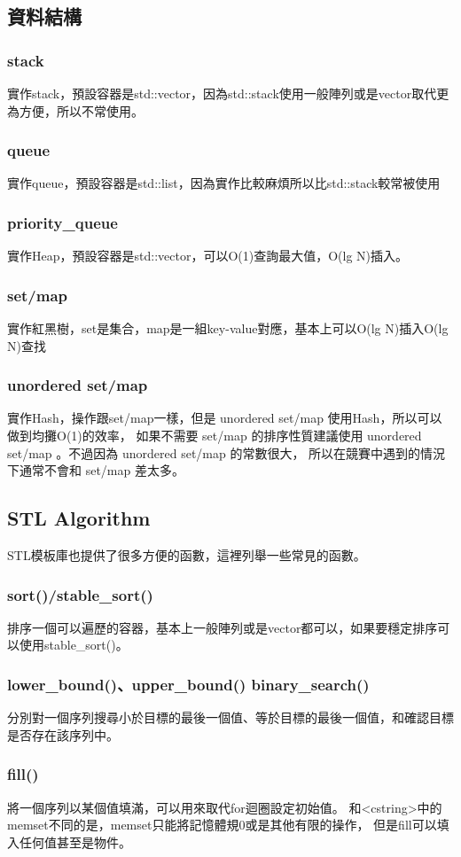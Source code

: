 \documentclass{article}
\begin{document}
\subsection{資料結構}
\subsubsection{stack}
實作stack，預設容器是std::vector，因為std::stack使用一般陣列或是vector取代更為方便，所以不常使用。
\subsubsection{queue}
實作queue，預設容器是std::list，因為實作比較麻煩所以比std::stack較常被使用
\subsubsection{priority\_queue}
實作Heap，預設容器是std::vector，可以O(1)查詢最大值，O(lg N)插入。
\subsubsection{set/map}
實作紅黑樹，set是集合，map是一組key-value對應，基本上可以O(lg N)插入O(lg N)查找
\subsubsection{unordered set/map}
實作Hash，操作跟set/map一樣，但是 unordered set/map 使用Hash，所以可以做到均攤O(1)的效率，
如果不需要 set/map 的排序性質建議使用 unordered set/map 。不過因為 unordered set/map 的常數很大，
所以在競賽中遇到的情況下通常不會和 set/map 差太多。

\subsection{STL Algorithm}
STL模板庫也提供了很多方便的函數，這裡列舉一些常見的函數。
\subsubsection{sort()/stable\_sort()}
排序一個可以遍歷的容器，基本上一般陣列或是vector都可以，如果要穩定排序可以使用stable\_sort()。
\subsubsection{lower\_bound()、upper\_bound() binary\_search()}
分別對一個序列搜尋小於目標的最後一個值、等於目標的最後一個值，和確認目標是否存在該序列中。
\subsubsection{fill()}
將一個序列以某個值填滿，可以用來取代for迴圈設定初始值。
和<cstring>中的memset不同的是，memset只能將記憶體規0或是其他有限的操作，
但是fill可以填入任何值甚至是物件。
\end{document}
